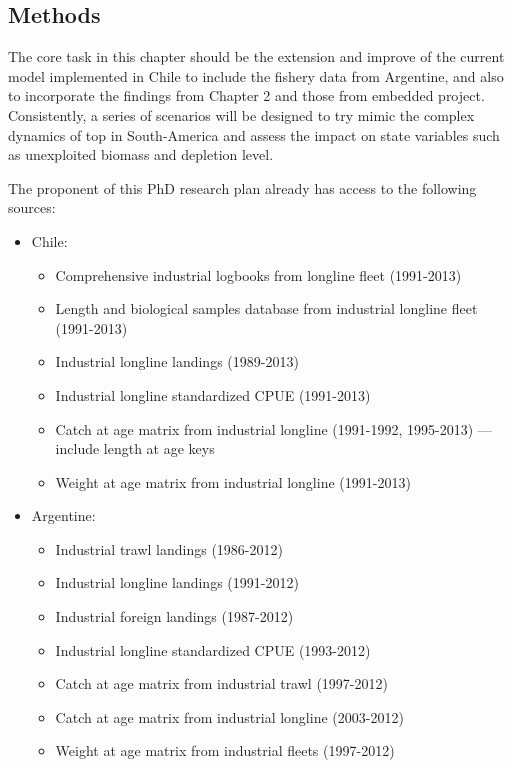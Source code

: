 \subsection*{Methods}

The core task in this chapter should be the extension and improve of the current model implemented in Chile to include the fishery data from Argentine, and also to incorporate the findings from Chapter 2 and those from embedded project. Consistently, a series of scenarios will be designed to try mimic the complex dynamics of \acl{top} in South-America and assess the impact on state variables such as unexploited biomass and depletion level. 

The proponent of this PhD research plan already has access to the following sources:

{\small 
\begin{itemize}
	\item Chile:
	\begin{itemize}
		\item Comprehensive industrial logbooks from  longline fleet (1991-2013)
		\item Length and biological samples database from industrial longline fleet (1991-2013)
		\item Industrial longline landings (1989-2013)
		\item Industrial longline standardized CPUE (1991-2013) 
		\item Catch at age matrix from industrial longline (1991-1992, 1995-2013) --- include length at age keys
		\item Weight at age matrix from industrial longline (1991-2013)   
	\end{itemize}
	\item Argentine:
	\begin{itemize}
		\item Industrial trawl landings (1986-2012)
		\item Industrial longline landings (1991-2012)
		\item Industrial foreign landings (1987-2012)
		\item Industrial longline standardized CPUE (1993-2012) 
		\item Catch at age matrix from industrial trawl (1997-2012)		
		\item Catch at age matrix from industrial longline (2003-2012)
		\item Weight at age matrix from industrial fleets (1997-2012)  
	\end{itemize}
\end{itemize}
}

